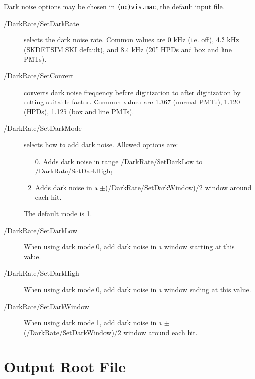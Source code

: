 Dark noise options may be chosen in \texttt{(no)vis.mac}, the default input file.
\begin{description}
\item[/DarkRate/SetDarkRate] selects the dark noise rate. Common values are 0 kHz (i.e. off), 4.2 kHz (SKDETSIM SKI default), and 8.4 kHz (20'' HPDs and box and line PMTs).
\item[/DarkRate/SetConvert] converts dark noise frequency before digitization to after digitization by setting suitable factor. Common values are 1.367 (normal PMTs), 1.120 (HPDs), 1.126 (box and line PMTs).
\item[/DarkRate/SetDarkMode] selects how to add dark noise. Allowed options are:
  \begin{enumerate}
  \item [0.]\setcounter{enumi}{0} Adds dark noise in range /DarkRate/SetDarkLow to /DarkRate/SetDarkHigh;
  \item Adds dark noise in a $\pm$(/DarkRate/SetDarkWindow)/2 window around each hit.
  \end{enumerate}
The default mode is 1.
\item[/DarkRate/SetDarkLow] When using dark mode 0, add dark noise in a window starting at this value.
\item[/DarkRate/SetDarkHigh] When using dark mode 0, add dark noise in a window ending at this value.
\item[/DarkRate/SetDarkWindow] When using dark mode 1, add dark noise in a $\pm$(/DarkRate/SetDarkWindow)/2 window around each hit.
\end{description}

\section{Output Root File}

